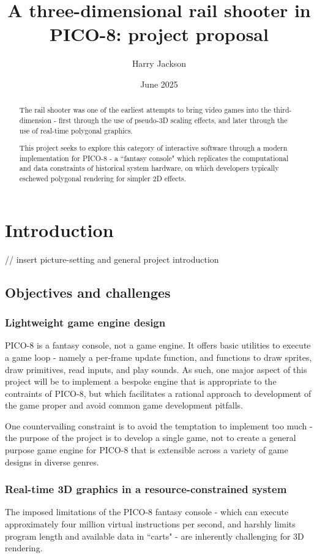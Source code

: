 \documentclass{article}
\title{A three-dimensional rail shooter in PICO-8: project proposal}
\author{Harry Jackson}
\date{June 2025}
\begin{document}
\maketitle

\begin{abstract}
The rail shooter was one of the earliest attempts to bring video
games into the third-dimension - first through the use of pseudo-3D
scaling effects, and later through the use of real-time polygonal graphics.

This project seeks to explore this category of interactive software through a
modern implementation for PICO-8 - a ``fantasy console" which replicates the
computational and data constraints of historical system hardware, on which
developers typically eschewed polygonal rendering for simpler 2D effects.
\end{abstract}

\section{Introduction}

// insert picture-setting and general project introduction

\subsection*{Objectives and challenges}

\subsubsection*{Lightweight game engine design}
PICO-8 is a fantasy console, not a game engine. It offers basic utilities to execute a game loop -
namely a per-frame update function, and functions to draw sprites, draw primitives, read inputs, and
play sounds. As such, one major aspect of this project will be to implement a bespoke engine that is
appropriate to the contraints of PICO-8, but which facilitates a rational approach to development of
the game proper and avoid common game development pitfalls.

One countervailing constraint is to avoid the temptation to implement too much - the purpose of the
project is to develop a single game, not to create a general purpose game engine for PICO-8 that is
extensible across a variety of game designs in diverse genres.\cite{gregory}

\subsubsection*{Real-time 3D graphics in a resource-constrained system}
The imposed limitations of the PICO-8 fantasy console - which can execute approximately four million
virtual instructions per second, and harshly limits program length and available data in ``carts" -
are inherently challenging for 3D rendering.
\end{document}
